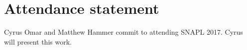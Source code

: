 \documentclass[letterpaper,USenglish]{lipics-v2016}
\begin{document}
\section{Attendance statement}

Cyrus Omar and Matthew Hammer commit to attending SNAPL 2017.
%
Cyrus will present this work.

\end{document}
